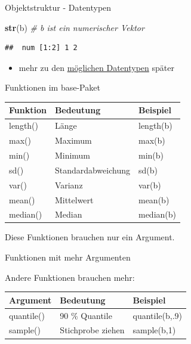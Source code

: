 \documentclass[ignorenonframetext,]{beamer}
\newenvironment{Shaded}{}{}
\newcommand{\KeywordTok}[1]{\textcolor[rgb]{0.00,0.44,0.13}{\textbf{{#1}}}}
\newcommand{\CommentTok}[1]{\textcolor[rgb]{0.38,0.63,0.69}{\textit{{#1}}}}
\newcommand{\NormalTok}[1]{{#1}}
\providecommand{\tightlist}{%
\setlength{\itemsep}{0pt}\setlength{\parskip}{0pt}}
\begin{document}
\begin{frame}[fragile]{Objektstruktur - Datentypen}

\begin{Shaded}
\begin{Highlighting}[]
\KeywordTok{str}\NormalTok{(b) }\CommentTok{# b ist ein numerischer Vektor}
\end{Highlighting}
\end{Shaded}

\begin{verbatim}
##  num [1:2] 1 2
\end{verbatim}

\begin{itemize}
\tightlist
\item
  mehr zu den
  \href{http://www.statmethods.net/management/typeconversion.html}{möglichen
  Datentypen} später
\end{itemize}

\end{frame}

\begin{frame}{Funktionen im base-Paket}

\begin{longtable}[]{@{}lll@{}}
\toprule
Funktion & Bedeutung & Beispiel\tabularnewline
\midrule
\endhead
length() & Länge & length(b)\tabularnewline
max() & Maximum & max(b)\tabularnewline
min() & Minimum & min(b)\tabularnewline
sd() & Standardabweichung & sd(b)\tabularnewline
var() & Varianz & var(b)\tabularnewline
mean() & Mittelwert & mean(b)\tabularnewline
median() & Median & median(b)\tabularnewline
\bottomrule
\end{longtable}

Diese Funktionen brauchen nur ein Argument.

\end{frame}

\begin{frame}{Funktionen mit mehr Argumenten}

Andere Funktionen brauchen mehr:

\begin{longtable}[]{@{}lll@{}}
\toprule
Argument & Bedeutung & Beispiel\tabularnewline
\midrule
\endhead
quantile() & 90 \% Quantile & quantile(b,.9)\tabularnewline
sample() & Stichprobe ziehen & sample(b,1)\tabularnewline
\bottomrule
\end{longtable}

\end{frame}
\end{document}
